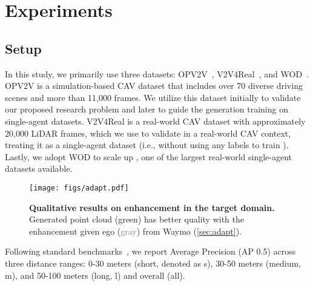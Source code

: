 
\section{Experiments}
\label{sec:exp}
\subsection{Setup}
In this study, we primarily use three datasets: OPV2V~\citep{xu2022opv2v}, V2V4Real~\citep{xu2023v2v4real}, and WOD~\citep{sun2020waymo}. OPV2V is a simulation-based CAV dataset that includes over 70 diverse driving scenes and more than 11,000 frames. We utilize this dataset initially to validate our proposed research problem and later to guide the generation training on single-agent datasets. V2V4Real is a real-world CAV dataset with approximately 20,000 LiDAR frames, which we use to validate \ours in a real-world CAV context, treating it as a single-agent dataset (i.e., without using any labels to train \ours). Lastly, we adopt WOD to scale up \ours, one of the largest real-world single-agent datasets available.





\begin{figure}
\centering
\texttt{[image: figs/adapt.pdf]}
\vspace{-4mm}
\caption{
\label{fig:adapt}
\small \textbf{Qualitative results on enhancement in the target domain.} Generated point cloud (\textcolor{customgreen}{green}) has better quality with the enhancement given ego (\textcolor{gray}{gray}) from Waymo (\cf \cref{sec:adapt}).}
\vspace{-5mm}
\end{figure}










 


Following standard benchmarks~\citep{xu2022opv2v,xu2023v2v4real}, we report Average Precision (AP 0.5) across three distance ranges: 0-30 meters (short, denoted as s), 30-50 meters (medium, m), and 50-100 meters (long, l) and overall (all). 


